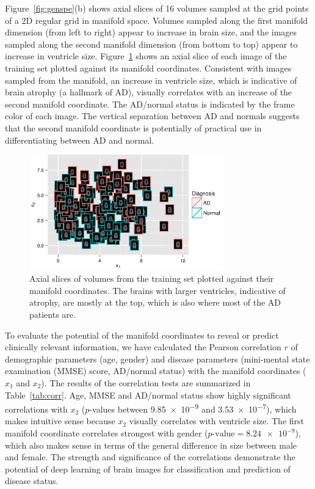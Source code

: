 Figure~\ref{fig:genspe}(b) shows axial slices of 16 volumes sampled at the
grid points of a 2D regular grid in manifold space. Volumes sampled along the
first manifold dimension (from left to right) appear to increase in brain size,
and the images sampled along the second manifold dimension (from bottom to top)
appear to increase in ventricle size. Figure~\ref{fig:scatter} shows an axial slice of
each image of the training set plotted against its manifold coordinates.
Consistent with images sampled from the manifold, an increase in ventricle size,
which is indicative of brain atrophy (a hallmark of AD), visually correlates
with an increase of the second manifold coordinate.
The AD/normal status is indicated by the frame color of each image. The vertical
separation between AD and normals suggests that the second manifold coordinate is
potentially of practical use in differentiating between AD and normal.

\begin{figure}[tb] \centering
\includegraphics[width=0.75\textwidth]{figures/MICCAI2013_scatter3}
\caption{Axial slices of volumes from the training set plotted against their
manifold coordinates. The brains with larger ventricles, indicative of atrophy,
are mostly at the top, which is also where most of the AD patients are.}
\label{fig:scatter}
\end{figure}

To evaluate the potential of the manifold coordinates to reveal or predict
clinically relevant information, we have calculated the Pearson correlation $r$
of demographic parameters (age, gender) and disease parameters (mini-mental
state examination (MMSE) score, AD/normal status) with the manifold coordinates
($x_1$ and $x_2$). The results of the correlation tests are summarized in
Table~\ref{tab:corr}. Age, MMSE and AD/normal status show highly significant
correlations with $x_2$ ($p$-values between \num{9.85e-9} and \num{3.53e-7}),
which makes intuitive sense because $x_2$ visually correlates with ventricle
size. The first manifold coordinate correlates strongest with gender
($p\text{-value} = \num{8.24e-9}$), which also makes sense in terms of the
general difference in size between male and female. The strength and
significance of the correlations demonstrate the potential of deep learning of
brain images for classification and prediction of disease status.

